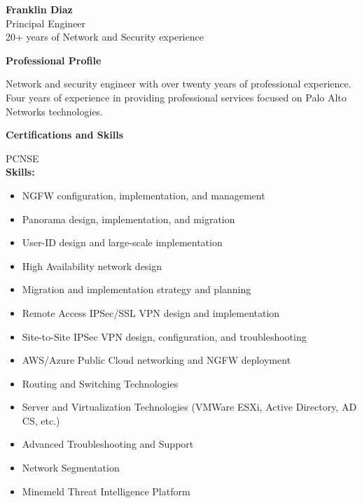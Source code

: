 \documentclass{article}
\begin{document}
	
	\pagestyle{empty}
	
	\bgroup
	
	\color{#000080}
	
	{\Large\bfseries Franklin Diaz}\vspace{0.1in}\\
	Principal Engineer \\
	20+ years of Network and Security experience
	
	\vspace{0.2in}
	
	{\large\bfseries Professional Profile}
	
	Network and security engineer with over twenty years of professional experience. Four years of experience in providing professional services focused on Palo Alto 
	Networks technologies.
	
	\vspace{0.2in}
	
	{\Large\bfseries Certifications and Skills}
	
	{\color{#ffffff}\large PCNSE}\\
	
	{\large\bfseries Skills:}
	\begin{itemize}
		\item NGFW configuration, implementation, and management
		\item Panorama design, implementation, and migration
		\item User-ID design and large-scale implementation
		\item High Availability network design
		\item Migration and implementation strategy and planning
		\item Remote Access IPSec/SSL VPN design and implementation
		\item Site-to-Site IPSec VPN design, configuration, and troubleshooting
		\item AWS/Azure Public Cloud networking and NGFW deployment
		\item Routing and Switching Technologies
		\item Server and Virtualization Technologies (VMWare ESXi, Active Directory, AD CS, etc.)
		\item Advanced Troubleshooting and Support
		\item Network Segmentation
		\item Minemeld Threat Intelligence Platform
	\end{itemize}
	
	\vspace{0.2in}
	
\end{document}
